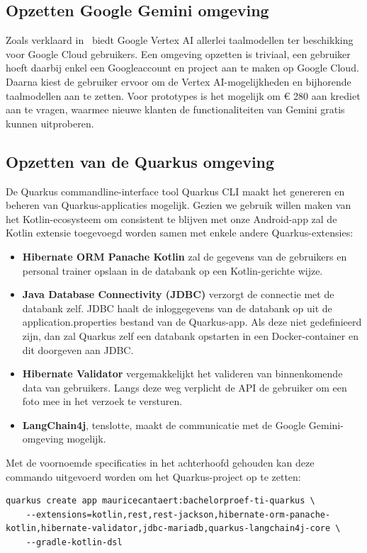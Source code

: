 \subsection{Opzetten Google Gemini omgeving}
\label{subsec:opzetten-google-gemini-omgeving}
Zoals verklaard in~ biedt Google Vertex AI allerlei taalmodellen ter beschikking voor Google Cloud gebruikers.
Een omgeving opzetten is triviaal, een gebruiker hoeft daarbij enkel een Googleaccount en project aan te maken op Google Cloud.
Daarna kiest de gebruiker ervoor om de Vertex AI-mogelijkheden en bijhorende taalmodellen aan te zetten.
Voor prototypes is het mogelijk om € 280 aan krediet aan te vragen, waarmee nieuwe klanten de functionaliteiten van Gemini gratis kunnen uitproberen.

\subsection{Opzetten van de Quarkus omgeving}
\label{subsec:opzetten-quarkus-omgeving}
De Quarkus commandline-interface tool Quarkus CLI maakt het genereren en beheren van Quarkus-applicaties mogelijk.
Gezien we gebruik willen maken van het Kotlin-ecosysteem om consistent te blijven met onze Android-app zal de Kotlin extensie toegevoegd worden samen met enkele andere Quarkus-extensies:
\begin{itemize}
    \item \textbf{Hibernate ORM Panache Kotlin} zal de gegevens van de gebruikers en personal trainer opslaan in de databank op een Kotlin-gerichte wijze.
    \item \textbf{Java Database Connectivity (JDBC)} verzorgt de connectie met de databank zelf.
    JDBC haalt de inloggegevens van de databank op uit de application.properties bestand van de Quarkus-app.
    Als deze niet gedefinieerd zijn, dan zal Quarkus zelf een databank opstarten in een Docker-container en dit doorgeven aan JDBC\@.
    \item \textbf{Hibernate Validator} vergemakkelijkt het valideren van binnenkomende data van gebruikers.
    Langs deze weg verplicht de API de gebruiker om een foto mee in het verzoek te versturen.
    \item \textbf{LangChain4j}, tenslotte, maakt de communicatie met de Google Gemini-omgeving mogelijk.
\end{itemize}
Met de voornoemde specificaties in het achterhoofd gehouden kan deze commando uitgevoerd worden om het Quarkus-project op te zetten:
\begin{mdframed}[backgroundcolor=bg]
    \begin{verbatim}
quarkus create app mauricecantaert:bachelorproef-ti-quarkus \
    --extensions=kotlin,rest,rest-jackson,hibernate-orm-panache-kotlin,hibernate-validator,jdbc-mariadb,quarkus-langchain4j-core \
    --gradle-kotlin-dsl
    \end{verbatim}
\end{mdframed}

